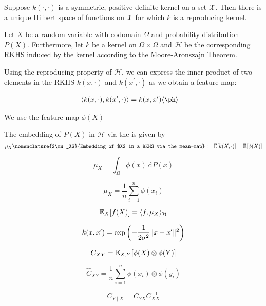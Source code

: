 \begin{theorem}
Suppose $k(\cdot, \cdot)$ is a symmetric, positive definite kernel on a set $\mathcal{X}$. Then there is a unique Hilbert space of functions on $\mathcal{X}$ for which $k$ is a reproducing kernel.
\end{theorem}


Let $X$ be a random variable with codomain $\Omega$ and probability distribution $P(X)$. Furthermore, let $k$ be a kernel on $\Omega \times \Omega$ and $\mathcal{H}$ be the corresponding RKHS induced by the kernel according to the Moore-Aronszajn Theorem.

Using the reproducing property of $\mathcal{H}$, we can express the inner product of two elements in the RKHS $k(x, \cdot)$ and $k(x^\prime, \cdot)$ as  we obtain a feature map:

\begin{align}
	\innerProd{k(x, \cdot), k(x^\prime, \cdot)} &= k(x, x^\prime)
    \innerProd{\ph}
\end{align}

We use the feature map $\phi(X)$

\begin{definition}
The embedding of $P(X)$ in $\mathcal{H}$ via the  is given by
\begin{equation}
	\mu_{X}\nomenclature{$\mu_X$}{Embedding of $X$ in a RKHS via the mean-map} \defeq \E[k(X, \cdot)] = \E[\phi(X)]
\end{equation}
\end{definition}

\begin{equation}
\mu_{X} = \int_\Omega \phi(x) \ \mathrm{d}P(x)
\end{equation}

\begin{equation}
\mu_{X} = \frac{1}{n} \sum_{i=1}^n \phi(x_i)
\end{equation}

\begin{equation}
\mathbb{E}_X[f(X)] = \langle f, \mu_X\rangle_\mathcal{H}
\end{equation}

\begin{equation}
k(x,x') = \exp\left(-\frac{1}{2\sigma^2} \lVert x-x'\rVert^2 \right)  
\end{equation}

\begin{equation}
	C_{XY} = \mathbb{E}_{X, Y}[\phi(X) \otimes \phi(Y)]
\end{equation}

\begin{equation}
	\widehat{C}_{XY} = \frac{1}{n} \sum_{i=1}^n \phi(x_i) \otimes \phi(y_i)
\end{equation}

\begin{equation}
	C_{Y \mid X} = C_{YX} C_{XX}^{-1}
\end{equation}

